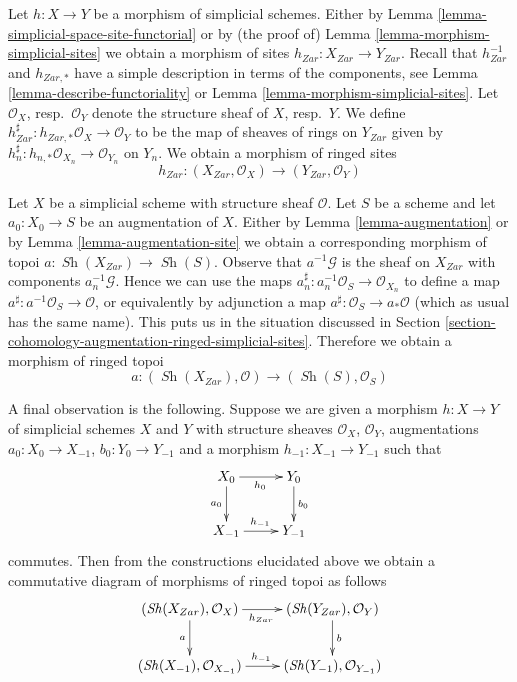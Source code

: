 \documentclass{stacks-project}
\theoremstyle{plain}
\theoremstyle{definition}
\theoremstyle{remark}
\numberwithin{equation}{subsection}
\def\Sh{\mathop{\mathit{Sh}}\nolimits}
\begin{document}
\medskip\noindent
Let $h : X \to Y$ be a morphism of simplicial schemes. Either by
Lemma \ref{lemma-simplicial-space-site-functorial} or by
(the proof of) Lemma \ref{lemma-morphism-simplicial-sites}
we obtain a morphism of sites $h_{Zar} : X_{Zar} \to Y_{Zar}$.
Recall that $h_{Zar}^{-1}$ and $h_{Zar, *}$ have a simple
description in terms of the components, see
Lemma \ref{lemma-describe-functoriality} or
Lemma \ref{lemma-morphism-simplicial-sites}.
Let $\mathcal{O}_X$, resp.\ $\mathcal{O}_Y$ denote the structure
sheaf of $X$, resp.\ $Y$. We define
$h_{Zar}^\sharp : h_{Zar, *}\mathcal{O}_X \to \mathcal{O}_Y$
to be the map of sheaves of rings on $Y_{Zar}$ given by
$h_n^\sharp : h_{n, *}\mathcal{O}_{X_n} \to \mathcal{O}_{Y_n}$ on $Y_n$.
We obtain a morphism of ringed sites
$$
h_{Zar} : (X_{Zar}, \mathcal{O}_X) \longrightarrow (Y_{Zar}, \mathcal{O}_Y)
$$

\medskip\noindent
Let $X$ be a simplicial scheme with structure sheaf $\mathcal{O}$.
Let $S$ be a scheme and let $a_0 : X_0 \to S$ be an augmentation of $X$.
Either by
Lemma \ref{lemma-augmentation} or by
Lemma \ref{lemma-augmentation-site}
we obtain a corresponding morphism of topoi $a : \Sh(X_{Zar}) \to \Sh(S)$.
Observe that $a^{-1}\mathcal{G}$ is the sheaf on $X_{Zar}$ with components
$a_n^{-1}\mathcal{G}$. Hence we can use the maps
$a_n^\sharp : a_n^{-1}\mathcal{O}_S \to \mathcal{O}_{X_n}$ to define
a map $a^\sharp : a^{-1}\mathcal{O}_S \to \mathcal{O}$, or equivalently
by adjunction a map $a^\sharp : \mathcal{O}_S \to a_*\mathcal{O}$
(which as usual has the same name). This puts us in the situation
discussed in
Section \ref{section-cohomology-augmentation-ringed-simplicial-sites}.
Therefore we obtain a morphism of ringed topoi
$$
a : (\Sh(X_{Zar}), \mathcal{O}) \longrightarrow (\Sh(S), \mathcal{O}_S)
$$

\medskip\noindent
A final observation is the following. Suppose we are given a morphism
$h : X \to Y$ of simplicial schemes $X$ and $Y$ with structure sheaves
$\mathcal{O}_X$, $\mathcal{O}_Y$, augmentations
$a_0 : X_0 \to X_{-1}$, $b_0 : Y_0 \to Y_{-1}$ and a morphism
$h_{-1} : X_{-1} \to Y_{-1}$ such that
$$
\xymatrix{
X_0 \ar[r]_{h_0} \ar[d]_{a_0} & Y_0 \ar[d]^{b_0} \\
X_{-1} \ar[r]^{h_{-1}} & Y_{-1}
}
$$
commutes. Then from the constructions elucidated above
we obtain a commutative diagram of morphisms of ringed topoi as follows
$$
\xymatrix{
(\Sh(X_{Zar}), \mathcal{O}_X) \ar[r]_{h_{Zar}} \ar[d]_a &
(\Sh(Y_{Zar}), \mathcal{O}_Y) \ar[d]^b \\
(\Sh(X_{-1}), \mathcal{O}_{X_{-1}}) \ar[r]^{h_{-1}} &
(\Sh(Y_{-1}), \mathcal{O}_{Y_{-1}})
}
$$
\end{document}
